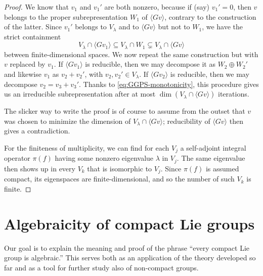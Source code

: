 \documentclass[reqno]{amsart} 
\begin{document}
\begin{proof}
  We know that $v_1$ and $v_1'$ are both nonzero, because if (say) $v_1' = 0$, then $v$ belongs to the proper subrepresentation $W_1$ of $\langle G v \rangle$, contrary to the construction of the latter.  Since $v_1'$ belongs to $V_\lambda$ and to $\langle G v \rangle$ but not to $W_1$, we have the strict containment
  \begin{equation}\label{eq:GGPS-monotonicity}
    V_\lambda \cap \langle G v_1 \rangle
    \subseteq 
    V_\lambda \cap W_1
    \subsetneq
    V_\lambda \cap \langle G v \rangle
  \end{equation}
  between finite-dimensional spaces.  We now repeat the same construction but with $v$ replaced by $v_1$.  If $\langle G v_1 \rangle$ is reducible, then we may decompose it as $W_2 \oplus W_2'$ and likewise $v_1$ as $v_2 + v_2'$, with $v_2, v_2' \in V_\lambda$.  If $\langle G v_2 \rangle$ is reducible, then we may decompose $v_2 = v_3 + v_3'$.  Thanks to \eqref{eq:GGPS-monotonicity}, this procedure gives us an irreducible subrepresentation after at most $\dim(V_\lambda \cap \langle G v \rangle)$ iterations.
  
  The slicker way to write the proof is of course to assume from the outset that $v$ was chosen to minimize the dimension of $V_{\lambda} \cap \langle G v \rangle$; reducibility of $\langle G v \rangle$ then gives a contradiction.
  
  For the finiteness of multiplicity, we can find for each $V_j$ a self-adjoint integral operator $\pi(f)$ having some nonzero eigenvalue $\lambda$ in $V_j$.  The same eigenvalue then shows up in every $V_k$ that is isomorphic to $V_j$.  Since $\pi(f)$ is assumed compact, its eigenspaces are finite-dimensional, and so the number of such $V_k$ is finite.
\end{proof}

\newpage



\section{Algebraicity of compact Lie groups}\label{sec:cnh2vouaco}
Our goal is to explain the meaning and proof of the phrase ``every compact Lie group is algebraic.''  This serves both as an application of the theory developed so far and as a tool for further study also of non-compact groups.
\end{document}
